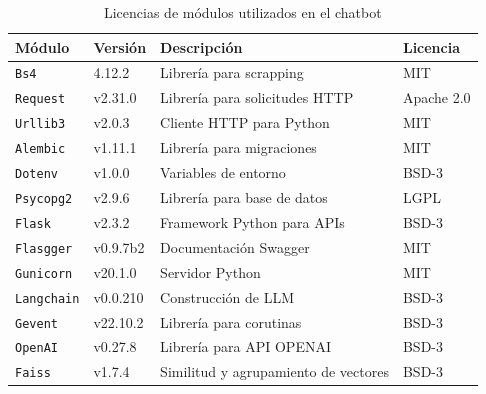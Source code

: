 \begin{table}[H]
\centering
\begin{tabular}{llll}
\toprule
Módulo                     & Versión       & Descripción        & Licencia                    \\
\midrule
\texttt{Bs4}       & 4.12.2 & Librería para scrapping & MIT               \\
\texttt{Request}       & v2.31.0 & Librería para solicitudes HTTP & Apache 2.0               \\
\texttt{Urllib3}       & v2.0.3 & Cliente HTTP para Python & MIT               \\
\texttt{Alembic}       & v1.11.1 & Librería para migraciones & MIT               \\
\texttt{Dotenv}       & v1.0.0 & Variables de entorno & BSD-3               \\
\texttt{Psycopg2}       & v2.9.6 & Librería para base de datos & LGPL               \\
\texttt{Flask}       & v2.3.2 & Framework Python para APIs & BSD-3               \\
\texttt{Flasgger}       & v0.9.7b2 & Documentación Swagger & MIT               \\
\texttt{Gunicorn}       & v20.1.0 & Servidor Python & MIT               \\
\texttt{Langchain}       & v0.0.210 & Construcción de LLM & BSD-3               \\
\texttt{Gevent}       & v22.10.2 & Librería para corutinas & BSD-3               \\
\texttt{OpenAI}       & v0.27.8 & Librería para API OPENAI & BSD-3               \\
\texttt{Faiss}       & v1.7.4 & Similitud y agrupamiento de vectores & BSD-3               \\
\bottomrule
\end{tabular}
\caption{Licencias de módulos utilizados en el chatbot}
\label{tab:chatbot-modulo}
\end{table}